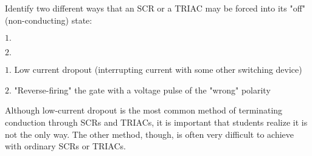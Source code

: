 

Identify two different ways that an SCR or a TRIAC may be forced into its "off" (non-conducting) state:

\medskip
\goodbreak
\item{$1.$} 
\item{$2.$} 
\medskip







\medskip
\goodbreak
\item{$1.$} Low current dropout (interrupting current with some other switching device)
\item{$2.$} "Reverse-firing" the gate with a voltage pulse of the "wrong" polarity
\medskip







Although low-current dropout is the most common method of terminating conduction through SCRs and TRIACs, it is important that students realize it is not the only way.  The other method, though, is often very difficult to achieve with ordinary SCRs or TRIACs.




